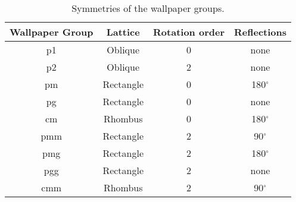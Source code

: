 \begin{table}
    \begin{tabular}{|c|c|c|c|}
        \hline
        Wallpaper Group & Lattice & Rotation order & Reflections \\
        \hline
        p1 & Oblique & 0 & none\\
        p2 & Oblique & 2 & none\\
        pm & Rectangle & 0 & 180$^\circ$\\
        pg & Rectangle & 0 & none\\
        cm & Rhombus & 0 & 180$^\circ$\\
        pmm & Rectangle & 2 & 90$^\circ$\\
        pmg & Rectangle & 2 & 180$^\circ$\\
        pgg & Rectangle & 2 & none\\
        cmm & Rhombus & 2 & 90$^\circ$\\
        \hline
    \end{tabular}   
    \caption{Symmetries of the wallpaper groups. \cite{Clark1}}
\end{table}